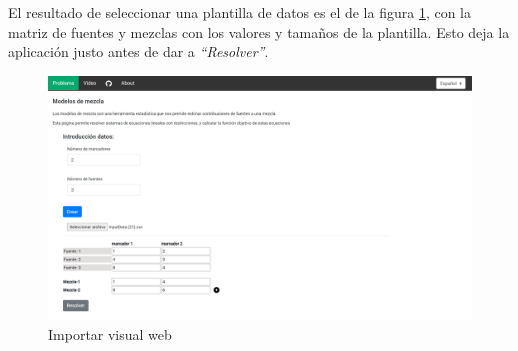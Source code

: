 \newpage
El resultado de seleccionar una plantilla de datos es el de la figura \ref{fig:visualwebimport}, con la matriz de fuentes y mezclas con los valores y tamaños de la plantilla. Esto deja la aplicación justo antes de dar a \textit{``Resolver''}.

\begin{figure}[h!] 
\centering
    \includegraphics[width=1\textwidth]{img/importVisual.PNG}
\caption{Importar visual web}
\label{fig:visualwebimport}
\end{figure}